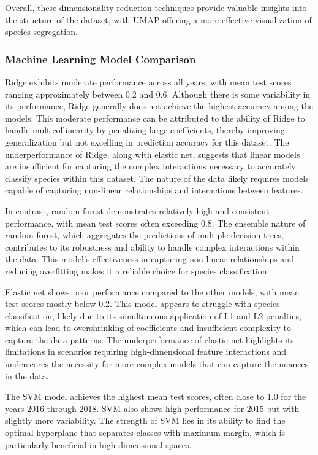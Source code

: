 \documentclass[english,11pt,a4paper,titlepage]{article}
\begin{document}
Overall, these dimensionality reduction techniques provide valuable insights into the structure of the dataset, with UMAP offering a more effective visualization of species segregation.

\subsubsection*{Machine Learning Model Comparison}
Ridge exhibits moderate performance across all years, with mean test scores ranging approximately between 0.2 and 0.6. Although there is some variability in its performance, Ridge generally does not achieve the highest accuracy among the models. This moderate performance can be attributed to the ability of Ridge to handle multicollinearity by penalizing large coefficients, thereby improving generalization but not excelling in prediction accuracy for this dataset. The underperformance of Ridge, along with elastic net, suggests that linear models are insufficient for capturing the complex interactions necessary to accurately classify species within this dataset. The nature of the data likely requires models capable of capturing non-linear relationships and interactions between features.

In contrast, random forest demonstrates relatively high and consistent performance, with mean test scores often exceeding 0.8. The ensemble nature of random forest, which aggregates the predictions of multiple decision trees, contributes to its robustness and ability to handle complex interactions within the data. This model’s effectiveness in capturing non-linear relationships and reducing overfitting makes it a reliable choice for species classification.

Elastic net shows poor performance compared to the other models, with mean test scores mostly below 0.2. This model appears to struggle with species classification, likely due to its simultaneous application of L1 and L2 penalties, which can lead to overshrinking of coefficients and insufficient complexity to capture the data patterns. The underperformance of elastic net highlights its limitations in scenarios requiring high-dimensional feature interactions and underscores the necessity for more complex models that can capture the nuances in the data.

The SVM model achieves the highest mean test scores, often close to 1.0 for the years 2016 through 2018. SVM also shows high performance for 2015 but with slightly more variability. The strength of SVM lies in its ability to find the optimal hyperplane that separates classes with maximum margin, which is particularly beneficial in high-dimensional spaces. 
\end{document}
